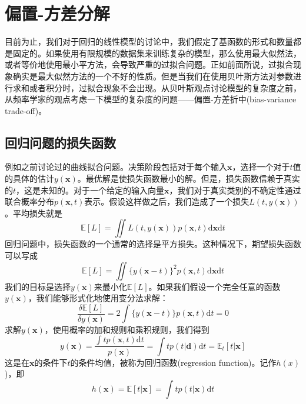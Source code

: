 \section{偏置-方差分解}
目前为止，我们对于回归的线性模型的讨论中，我们假定了基函数的形式和数量都是固定的。如果使用有限规模的数据集来训练复杂的模型，那么使用最大似然法，或者等价地使用最小平方法，会导致严重的过拟合问题。正如前面所说，过拟合现象确实是最大似然方法的一个不好的性质。但是当我们在使用贝叶斯方法对参数进行求和或者积分时，过拟合现象不会出现。从贝叶斯观点讨论模型的复杂度之前，从频率学家的观点考虑一下模型的复杂度的问题——偏置-方差折中(bias-variance trade-off)。

\subsection*{回归问题的损失函数}
例如之前讨论过的曲线拟合问题。决策阶段包括对于每个输入$\boldsymbol{x}$，选择一个对于$t$值的具体的估计$y(\boldsymbol{x})$。最优解是使损失函数最小的解。但是，损失函数信赖于真实的$t$，这是未知的。对于一个给定的输入向量$\boldsymbol{x}$，我们对于真实类别的不确定性通过联合概率分布$p(\boldsymbol{x},t)$表示。假设这样做之后，我们造成了一个损失$L(t,y(\boldsymbol{x}))$。平均损失就是
\begin{equation}
	\mathbb{E}[L]=\iint L(t,y(\boldsymbol{x}))p(\boldsymbol{x},t)\mathrm{d}\boldsymbol{x}\mathrm{d}t
\end{equation}
回归问题中，损失函数的一个通常的选择是平方损失。这种情况下，期望损失函数可以写成
\begin{equation}
	\mathbb{E}[L]=\iint \{y(\boldsymbol{x}-t)\}^2p(\boldsymbol{x},t)\mathrm{d}\boldsymbol{x}\mathrm{d}t
\end{equation}
我们的目标是选择$y(\boldsymbol{x})$来最小化$\mathbb{E}[L]$。如果我们假设一个完全任意的函数$y(\boldsymbol{x})$，我们能够形式化地使用变分法求解：
\begin{equation}
	\frac{\delta \mathbb{E}[L]}{\delta y(\boldsymbol{x})}=2\int \{y(\boldsymbol{x}-t)\}p(\boldsymbol{x},t)\mathrm{d}t=0
\end{equation}
求解$y(\boldsymbol{x})$，使用概率的加和规则和乘积规则，我们得到
\begin{equation}
	y(\boldsymbol{x})=\frac{\int tp(\boldsymbol{x},t)\mathrm{d}t}{p(\boldsymbol{x})}=\int tp(t|\boldsymbol{d})\mathrm{d}t=\mathbb{E}_t[t|\boldsymbol{x}]
\end{equation}
这是在$\boldsymbol{x}$的条件下$t$的条件均值，被称为回归函数(regression function)。记作$h(x)$)，即
\begin{equation}
	h(\boldsymbol{x})=\mathbb{E}[t|\boldsymbol{x}]=\int tp(t|\boldsymbol{x})\mathrm{d}t
\end{equation}
